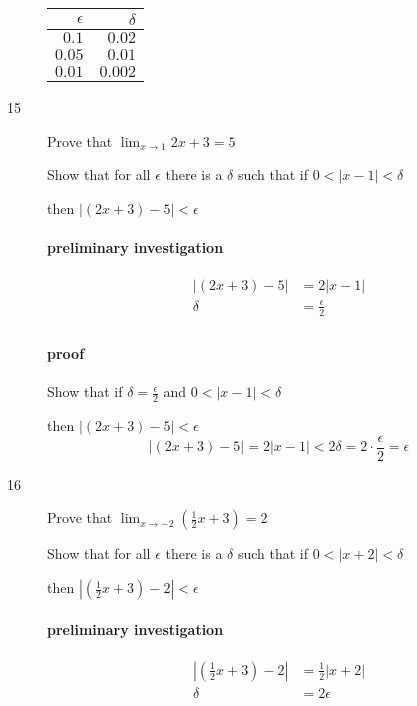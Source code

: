 \documentclass[letterpaper, landscape]{exam}
\begin{document}
\begin{description}
        \begin{tabular}[H]{rr}
          \toprule
          $\epsilon$ & $\delta$ \\
          \midrule
          $0.1$      & $0.02$ \\
          $0.05$     & $0.01$ \\
          $0.01$     & $0.002$ \\
          \bottomrule
        \end{tabular}

      \item[15] Prove that $\lim_{x \to 1} 2x + 3 = 5$

        Show that for all $\epsilon$ there is a $\delta$ such that if 
        $0 < |x - 1| < \delta$ 
        
        then $|(2x + 3) - 5| < \epsilon$

        \paragraph{preliminary investigation}
        \begin{align*}
          |(2x + 3) - 5| & = 2|x - 1| \\
          \delta         & = \frac{\epsilon}{2} \\
        \end{align*}

        \paragraph{proof}
        Show that if $\delta = \frac{\epsilon}{2}$ and $0 < |x - 1| < \delta$

        then $|(2x + 3) - 5| < \epsilon$
        \[
          |(2x + 3) - 5| = 2|x - 1| < 2 \delta = 2 \cdot \frac{\epsilon}{2} = \epsilon
        \]

      \newpage

      \item[16] Prove that $\lim_{x \to -2} \left( \frac{1}{2} x + 3 \right) = 2$

        Show that for all $\epsilon$ there is a $\delta$ such that if 
        $0 < |x + 2| < \delta$ 
        
        then $ \left| \left( \frac{1}{2} x + 3 \right) - 2 \right| < \epsilon$

        \paragraph{preliminary investigation}
        \begin{align*}
          \left| \left( \frac{1}{2} x + 3 \right) - 2 \right| & = \frac{1}{2}|x + 2| \\
          \delta         & = 2 \epsilon \\
        \end{align*}


\end{description}
\end{document}

